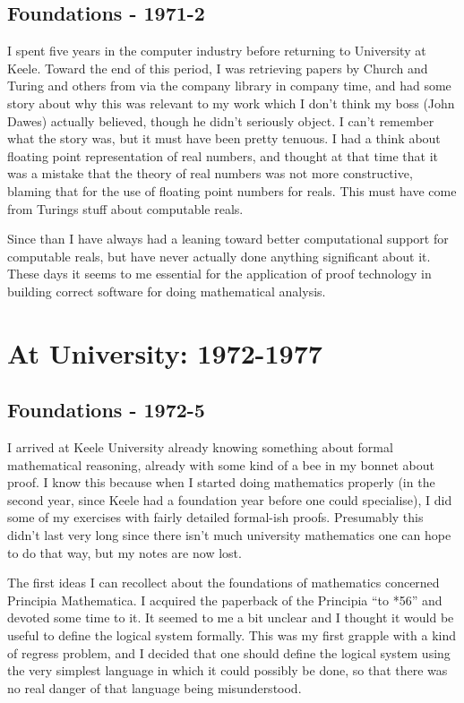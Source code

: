 \section{Foundations - 1971-2}

I spent five years in the computer industry before returning to University at Keele.
Toward the end of this period, I was retrieving papers by Church and Turing and others from via the company library in company time, and had some story about why this was relevant to my work which I don't think my boss (John Dawes) actually believed, though he didn't seriously object.
I can't remember what the story was, but it must have been pretty tenuous.
I had a think about floating point representation of real numbers, and thought at that time that it was a mistake that the theory of real numbers was not more constructive, blaming that for the use of floating point numbers for reals.
This must have come from Turings stuff about computable reals.

Since than I have always had a leaning toward better computational support for computable reals, but have never actually done anything significant about it.
These days it seems to me essential for the application of proof technology in building correct software for doing mathematical analysis.

\chapter{At University: 1972-1977}

\section{Foundations - 1972-5}

I arrived at Keele University already knowing something about formal mathematical reasoning, already with some kind of a bee in my bonnet about proof.
I know this because when I started doing mathematics properly (in the second year, since Keele had a foundation year before one could specialise), I did some of my exercises with fairly detailed formal-ish proofs.
Presumably this didn't last very long since there isn't much university mathematics one can hope to do that way, but my notes are now lost.

The first ideas I can recollect about the foundations of mathematics concerned Principia Mathematica.
I acquired the paperback of the Principia ``to *56'' and devoted some time to it.
It seemed to me a bit unclear and I thought it would be useful to define the logical system formally.
This was my first grapple with a kind of regress problem, and I decided that one should define the logical system using the very simplest language in which it could possibly be done, so that there was no real danger of that language being misunderstood.

